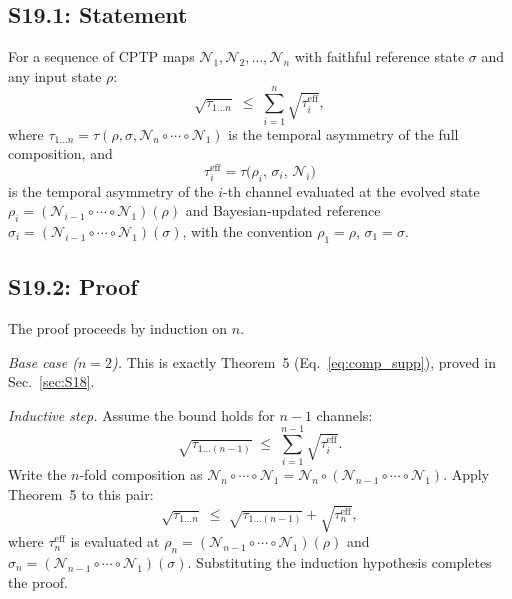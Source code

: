 \documentclass[prl,twocolumn,superscriptaddress,longbibliography]{revtex4-2}
\newcommand{\chan}{\mathcal{N}}
\newcommand{\tauasym}{\tau}
\begin{document}
\subsection{S19.1: Statement}

For a sequence of CPTP maps
$\chan_1, \chan_2, \ldots, \chan_n$ with faithful reference state
$\sigma$ and any input state $\rho$:
\begin{equation}
\sqrt{\tauasym_{1\ldots n}}
\;\leq\; \sum_{i=1}^{n} \sqrt{\tauasym_i^{\mathrm{eff}}},
\label{eq:Ncomp}
\end{equation}
where $\tauasym_{1\ldots n}
= \tauasym(\rho, \sigma, \chan_n \circ \cdots \circ \chan_1)$
is the temporal asymmetry of the full composition, and
\begin{equation}
\tauasym_i^{\mathrm{eff}}
= \tauasym\!\big(\rho_i,\, \sigma_i,\, \chan_i\big)
\label{eq:tau_eff_i}
\end{equation}
is the temporal asymmetry of the $i$-th channel evaluated at the
evolved state $\rho_i = (\chan_{i-1} \circ \cdots \circ \chan_1)(\rho)$
and Bayesian-updated reference
$\sigma_i = (\chan_{i-1} \circ \cdots \circ \chan_1)(\sigma)$,
with the convention $\rho_1 = \rho$, $\sigma_1 = \sigma$.

\subsection{S19.2: Proof}

The proof proceeds by induction on $n$.

\emph{Base case ($n = 2$).}
This is exactly Theorem~5 (Eq.~\eqref{eq:comp_supp}), proved in
Sec.~\ref{sec:S18}.

\emph{Inductive step.}
Assume the bound holds for $n-1$ channels:
\begin{equation}
\sqrt{\tauasym_{1\ldots(n-1)}}
\;\leq\; \sum_{i=1}^{n-1} \sqrt{\tauasym_i^{\mathrm{eff}}}.
\end{equation}
Write the $n$-fold composition as
$\chan_n \circ \cdots \circ \chan_1
= \chan_n \circ (\chan_{n-1} \circ \cdots \circ \chan_1)$.
Apply Theorem~5 to this pair:
\begin{equation}
\sqrt{\tauasym_{1\ldots n}}
\;\leq\; \sqrt{\tauasym_{1\ldots(n-1)}}
+ \sqrt{\tauasym_n^{\mathrm{eff}}},
\end{equation}
where $\tauasym_n^{\mathrm{eff}}$ is evaluated at
$\rho_n = (\chan_{n-1} \circ \cdots \circ \chan_1)(\rho)$ and
$\sigma_n = (\chan_{n-1} \circ \cdots \circ \chan_1)(\sigma)$.
Substituting the induction hypothesis completes the proof.
\end{document}
